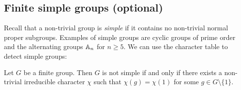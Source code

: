 %
%
\subsection{Finite simple groups (optional)}

Recall that a non-trivial group is \emph{simple} if it contains no non-trivial normal 
proper subgroups. Examples of simple groups are cyclic groups of prime order
and the alternating groups $\mathbb{A}_n$ for $n\geq5$. 
We can use the character table to detect simple groups:

\begin{proposition}
    Let $G$ be a finite group. Then $G$ is not simple if and only if 
    there exists a non-trivial irreducible character $\chi$ such that
    $\chi(g)=\chi(1)$ 
    for some $g\in G\setminus\{1\}$. 
\end{proposition}


